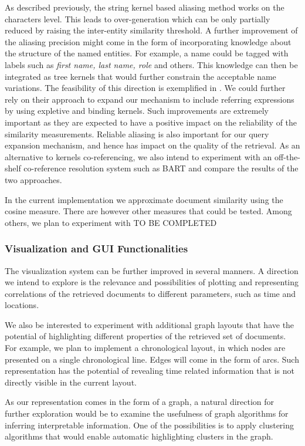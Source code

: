 As described previously, the string kernel based aliasing method works on the characters level. 
This leads to over-generation which can be only partially reduced by raising the inter-entity similarity threshold. 
A further improvement of the aliasing precision might come in the form of incorporating knowledge about the structure of the named entities. 
For example, a name could be tagged
with labels such as \emph{first name, last name, role} and others. This knowledge can then be integrated as tree kernels
that would further constrain the acceptable name variations. The feasibility of this direction is exemplified in \cite{string_kernel_coref}.
We could further rely on their approach to expand our mechanism to include referring expressions by using expletive and binding kernels.
Such improvements are extremely important as they are expected to have a positive impact on the reliability of the similarity measurements. 
Reliable aliasing is also important for our query expansion mechanism, and hence has impact on the quality of the retrieval.
As an alternative to kernels co-referencing, we also intend to experiment with an off-the-shelf co-reference resolution system such as 
BART and compare the results of the two approaches. 

In the current implementation we approximate document similarity using the cosine measure. There are however other measures that
could be tested. Among others, we plan to experiment with TO BE COMPLETED


\subsubsection{Visualization and GUI Functionalities}
The visualization system can be further improved in several manners. 
A direction we intend to explore is the relevance and possibilities of plotting and representing correlations of 
the retrieved documents to different parameters, such as time and locations.

We also be interested to experiment with additional graph layouts that have the potential of highlighting different properties of the 
retrieved set of documents. For example, we plan to implement a chronological layout, in which nodes are presented on a single chronological 
line. Edges will come in the form of arcs. Such representation has the potential of revealing time related information that is not 
directly visible in the current layout. 

As our representation comes in the form of a graph, a natural direction for further exploration would be to examine the usefulness of 
graph algorithms for inferring interpretable information. One of the possibilities is to apply clustering algorithms 
that would enable automatic highlighting clusters in the graph. 

